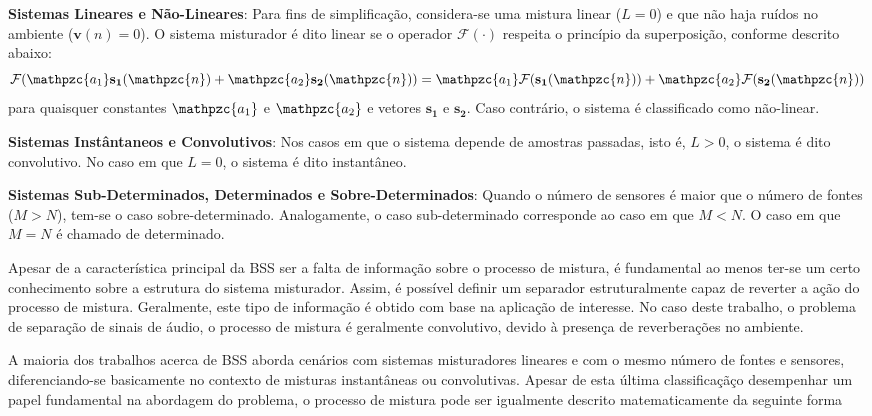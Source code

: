     \textbf{Sistemas Lineares e Não-Lineares}: Para fins de simplificação, considera-se uma mistura linear ($L=0$) e que não haja ruídos no ambiente ($\mathbf{v}(n)=0$). O sistema misturador é dito linear se o operador  $\mathcal{F}(\cdot)$ respeita o princípio da superposição, conforme descrito abaixo:
        \begin{equation}\label{eq:linearity}
            \mathcal{F}(\mathpzc{a_1}\mathbf{s_1}(\mathpzc{n}) + \mathpzc{a_2}\mathbf{s_2}(\mathpzc{n})) = \mathpzc{a_1}\mathcal{F}(\mathbf{s_1}(\mathpzc{n})) + \mathpzc{a_2}\mathcal{F}(\mathbf{s_2}(\mathpzc{n}))
        \end{equation}
    para quaisquer constantes $\mathpzc{a_1}$ e $\mathpzc{a_2}$ e vetores $\mathbf{s_1}$ e $\mathbf{s_2}$. Caso contrário, o sistema é classificado como não-linear. 
    
     \textbf{Sistemas Instântaneos e Convolutivos}: Nos casos em que o sistema depende de amostras passadas, isto é, $L>0$, o sistema é dito convolutivo. No caso em que $L=0$, o sistema é dito instantâneo.
    
     \textbf{Sistemas Sub-Determinados, Determinados e Sobre-Determinados}: Quando o número de sensores é maior que o número de fontes ($M>N$), tem-se o caso sobre-determinado. Analogamente, o caso sub-determinado corresponde ao caso em que $M<N$. O caso em que $M=N$ é chamado de determinado.
     
     Apesar de a característica principal da BSS ser a falta de informação sobre o processo de mistura, é fundamental ao menos ter-se um certo conhecimento sobre a estrutura do sistema misturador. Assim, é possível definir um separador estruturalmente capaz de reverter a ação do processo de mistura. Geralmente, este tipo de informação é obtido com base na aplicação de interesse. No caso deste trabalho, o problema de separação de sinais de áudio, o processo de mistura é geralmente convolutivo, devido à presença de reverberações no ambiente.
     
     A maioria dos trabalhos acerca de BSS aborda cenários com sistemas misturadores lineares e com o mesmo número de fontes e sensores, diferenciando-se basicamente no contexto de misturas instantâneas ou convolutivas. Apesar de esta última classificaçãço desempenhar um papel fundamental na abordagem do problema, o  processo de mistura pode ser igualmente descrito matematicamente da seguinte forma
     
